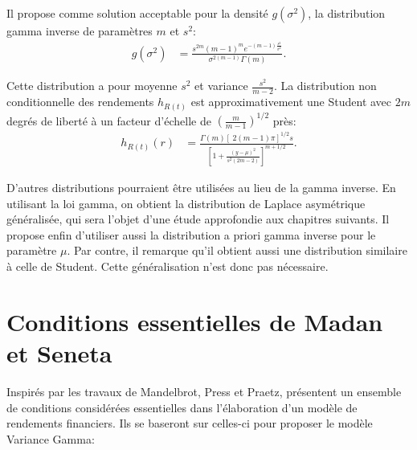 Il propose comme solution acceptable pour la densité $g(\sigma^2)$, la
distribution gamma inverse de paramètres $m$ et $s^2$:
\begin{align}
  \label{eq:gpraetz}
  g(\sigma^2) &=
  \frac{s^{2m}(m-1)^me^{-(m-1)\frac{s^2}{\sigma^2}}}{\sigma^{2(m-1)}\Gamma(m)}.
\end{align}

Cette distribution a pour moyenne $s^2$ et variance $\frac{s^2}{m-2}$.
La distribution non conditionnelle des rendements $h_{R(t)}$ est
approximativement une Student avec $2m$ degrés de liberté à un facteur
d'échelle de $\left(\frac{m}{m-1}\right)^{1/2}$ près:
\begin{align}
  \label{eq:hpraetz}
  h_{R(t)}(r) &= \frac{\Gamma(m)\left[\ 2(m-1)\pi
    \right]^{1/2}s}{\left[1+\frac{(y-\mu)^2}{s^2(2m-2)}
    \right]^{m+1/2}}.
\end{align}

D'autres distributions pourraient être utilisées au lieu de la gamma
inverse. En utilisant la loi gamma, on obtient la distribution de
Laplace asymétrique généralisée, qui sera l'objet d'une étude
approfondie aux chapitres suivants. Il propose enfin d'utiliser aussi
la distribution a priori gamma inverse pour le paramètre $\mu$. Par
contre, il remarque qu'il obtient aussi une distribution similaire à
celle de Student. Cette généralisation n'est donc pas nécessaire.

\section{Conditions essentielles de Madan et Seneta}
\label{sec:madanseneta90}

Inspirés par les travaux de Mandelbrot, Press et Praetz,
\cite{madan1990variance} présentent un ensemble de conditions
considérées essentielles dans l'élaboration d'un modèle de rendements
financiers. Ils se baseront sur celles-ci pour proposer le modèle
Variance Gamma:

